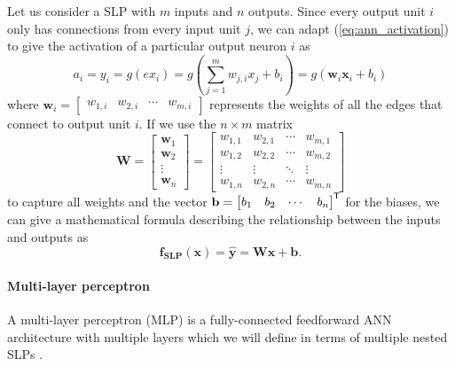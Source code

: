 \documentclass[oneside]{book}
\renewcommand\vec{\mathbf}
\newcommand*{\tran}{^{\mkern-1.5mu\mathsf{T}}}
\begin{document}
Let us consider a SLP with $m$ inputs and $n$ outputs. 
Since every output unit $i$ only has connections from every input unit $j$,
we can adapt (\ref{eq:ann_activation}) to give the activation of a particular output neuron $i$ as
\begin{equation}
    a_i = y_i = g\left({ex}_i\right) = g\left(\sum_{j=1}^m{w_{j,i} x_j} + b_i\right)
    = g\left( \vec{w}_i \vec{x}_i + b_i\right)
\end{equation}
where
$
    \vec{w}_i = \begin{bmatrix}
        w_{1,i} & w_{2,i} & \cdots & w_{m,i}
    \end{bmatrix}
$
represents the weights of all the edges that connect to output unit $i$.
If we use the $n \times m$ matrix
\begin{equation}
    \vec{W} = \begin{bmatrix}
        \vec{w}_1 \\ \vec{w}_2 \\ \vdots \\ \vec{w}_n
    \end{bmatrix} = \begin{bmatrix}
        w_{1,1} & w_{2,1} & \cdots & w_{m,1} \\
        w_{1,2} & w_{2,2} & \cdots & w_{m,2} \\
        \vdots & \vdots & \ddots & \vdots \\
        w_{1,n} & w_{2,n} & \cdots & w_{m,n}
    \end{bmatrix}
\end{equation}
to capture all weights and the vector $\vec{b} = \begin{bmatrix}
    b_1 & b_2 & \cdots & b_n
\end{bmatrix}\tran$ for the biases, we can give a mathematical formula describing the relationship between the inputs and outputs as
\begin{equation}
    \label{eq:single_layer_perceptron}
    \vec{f_{SLP}}(\vec{x}) = \vec{\hat{y}} = \vec{W} \vec{x} + \vec{b}.
\end{equation}


\paragraph{Multi-layer perceptron}
A multi-layer perceptron (MLP) is a fully-connected feedforward ANN architecture with multiple layers which we will define in terms of multiple nested SLPs \cite{burkov2019}.
\end{document}
